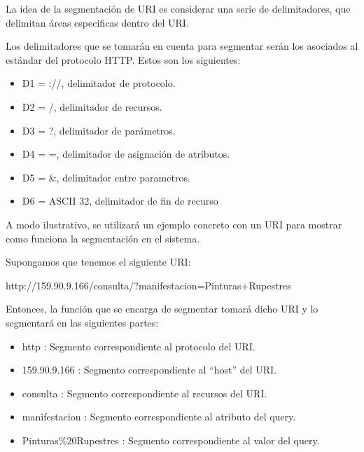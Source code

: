 La idea de la segmentación de URI es considerar una serie de delimitadores, que delimitan áreas especificas dentro del URI.

Los delimitadores que se tomarán en cuenta para segmentar serán los asociados al estándar del protocolo HTTP. Estos son los siguientes:

\begin{itemize}
\item D1 = ://, delimitador de protocolo.
\item D2 = /, delimitador de recursos.
\item D3 = ?, delimitador de parámetros.
\item D4 = =, delimitador de asignación de atributos.
\item D5 = \&, delimitador entre parametros.
\item D6 = ASCII 32, delimitador de fin de recurso
\end{itemize}

A modo ilustrativo, se utilizará un ejemplo concreto con un URI para mostrar como funciona la segmentación en el sistema.

Supongamos que tenemos el siguiente URI:

http://159.90.9.166/consulta/?manifestacion=Pinturas+Rupestres

Entonces, la función que se encarga de segmentar tomará dicho URI y lo segmentará en las siguientes partes:

\begin{itemize}
\item http : Segmento correspondiente al protocolo del URI. 
\item 159.90.9.166 : Segmento correspondiente al ``host'' del URI. 
\item consulta : Segmento correspondiente al recursos del URI.
\item manifestacion : Segmento correspondiente al atributo del query.
\item Pinturas\%20Rupestres : Segmento correspondiente al valor del query.  
\end{itemize}

















 




